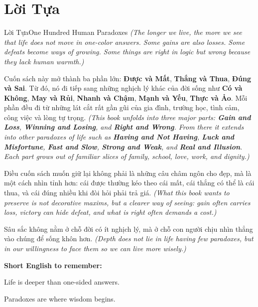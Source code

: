 \chapter*{Lời Tựa}

\begin{truyen}{Lời Tựa}{One Hundred Human Paradoxes}
\textit{(The longer we live, the more we see that life does not move in one-color answers. Some gains are also losses. Some defeats become ways of growing. Some things are right in logic but wrong because they lack human warmth.)}

Cuốn sách này mở thành ba phần lớn: \textbf{Được và Mất}, \textbf{Thắng và Thua}, \textbf{Đúng và Sai}. Từ đó, nó đi tiếp sang những nghịch lý khác của đời sống như \textbf{Có và Không}, \textbf{May và Rủi}, \textbf{Nhanh và Chậm}, \textbf{Mạnh và Yếu}, \textbf{Thực và Ảo}. Mỗi phần đều đi từ những lát cắt rất gần gũi của gia đình, trường học, tình cảm, công việc và lòng tự trọng.
\textit{(This book unfolds into three major parts: \textbf{Gain and Loss}, \textbf{Winning and Losing}, and \textbf{Right and Wrong}. From there it extends into other paradoxes of life such as \textbf{Having and Not Having}, \textbf{Luck and Misfortune}, \textbf{Fast and Slow}, \textbf{Strong and Weak}, and \textbf{Real and Illusion}. Each part grows out of familiar slices of family, school, love, work, and dignity.)}

Điều cuốn sách muốn giữ lại không phải là những câu châm ngôn cho đẹp, mà là một cách nhìn tỉnh hơn: cái được thường kéo theo cái mất, cái thắng có thể là cái thua, và cái đúng nhiều khi đòi hỏi phải trả giá.
\textit{(What this book wants to preserve is not decorative maxims, but a clearer way of seeing: gain often carries loss, victory can hide defeat, and what is right often demands a cost.)}
\end{truyen}

\begin{baihoc}
Sâu sắc không nằm ở chỗ đời có ít nghịch lý, mà ở chỗ con người chịu nhìn thẳng vào chúng để sống khôn hơn.
\textit{(Depth does not lie in life having few paradoxes, but in our willingness to face them so we can live more wisely.)}
\end{baihoc}

\begin{ghinhoanh}
\textbf{Short English to remember:}

Life is deeper than one-sided answers.

Paradoxes are where wisdom begins.
\end{ghinhoanh}

